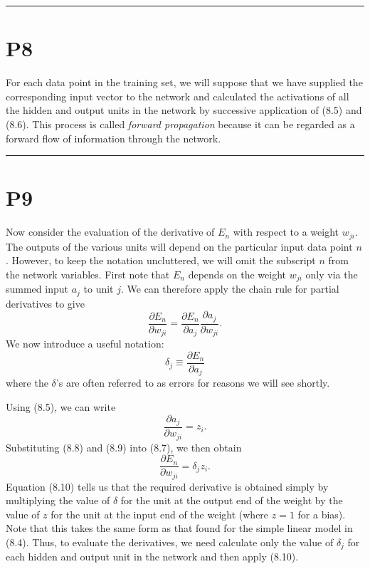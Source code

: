 \documentclass{article}
\begin{document}
\noindent\rule{\linewidth}{0.4pt}

\section{P8}

For each data point in the training set, we will suppose that we have supplied the corresponding input vector to the network and calculated the activations of all the hidden and output units in the network by successive application of (8.5) and (8.6). This process is called \textit{forward propagation} because it can be regarded as a forward flow of information through the network.

\noindent\rule{\linewidth}{0.4pt}

\section{P9}

Now consider the evaluation of the derivative of $E_n$ with respect to a weight $w_{ji}$. The outputs of the various units will depend on the particular input data point $n$. However, to keep the notation uncluttered, we will omit the subscript $n$ from the network variables. First note that $E_n$ depends on the weight $w_{ji}$ only via the summed input $a_j$ to unit $j$. We can therefore apply the chain rule for partial derivatives to give
\begin{equation}
    \frac{\partial E_n}{\partial w_{ji}} = \frac{\partial E_n}{\partial a_j} \frac{\partial a_j}{\partial w_{ji}}.
    \tag{8.7}
\end{equation}
We now introduce a useful notation:
\begin{equation}
    \delta_j \equiv \frac{\partial E_n}{\partial a_j}
    \tag{8.8}
\end{equation}
where the $\delta$'s are often referred to as errors for reasons we will see shortly. 

Using (8.5), we can write
\begin{equation}
    \frac{\partial a_j}{\partial w_{ji}} = z_i.
    \tag{8.9}
\end{equation}
Substituting (8.8) and (8.9) into (8.7), we then obtain
\begin{equation}
    \frac{\partial E_n}{\partial w_{ji}} = \delta_j z_i.
    \tag{8.10}
\end{equation}
Equation (8.10) tells us that the required derivative is obtained simply by multiplying the value of $\delta$ for the unit at the output end of the weight by the value of $z$ for the unit at the input end of the weight (where $z = 1$ for a bias). Note that this takes the same form as that found for the simple linear model in (8.4). Thus, to evaluate the derivatives, we need calculate only the value of $\delta_j$ for each hidden and output unit in the network and then apply (8.10).
\end{document}
